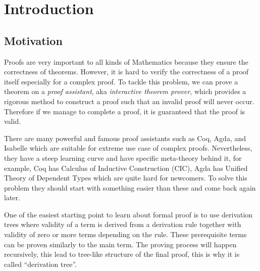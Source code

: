 \documentclass[master.tex]{subfiles}
\begin{document}
\chapter{Introduction}

\section{Motivation}

Proofs are very important to all kinds of Mathematics because they ensure the
correctness of theorems. However, it is hard to verify the correctness of a
proof itself especially for a complex proof. To tackle this problem, we can
prove a theorem on a \emph{proof assistant}, aka \emph{interactive theorem
  prover}, which provides a rigorous method to construct a proof such that an
invalid proof will never occur. Therefore if we manage to complete a proof, it
is guaranteed that the proof is valid.

There are many powerful and famous proof assistants such as
Coq\supercite{coq-official-website}, Agda\supercite{agda-official-website}, and
Isabelle\supercite{isabelle-official-website} which are suitable for extreme use
case of complex proofs. Nevertheless, they have a steep learning curve and have
specific meta-theory behind it, for example, Coq has Calculus of Inductive
Construction (CIC), Agda has Unified Theory of Dependent
Types\supercite{norell:thesis}\supercite{Luo:1994:CRT:184757} which are quite
hard for newcomers. To solve this problem they should start with something
easier than these and come back again later.

One of the easiest starting point to learn about formal proof is to use
derivation trees where validity of a term is derived from a derivation rule
together with validity of zero or more terms depending on the rule. These
prerequisite terms can be proven similarly to the main term. The proving process
will happen recursively, this lead to tree-like structure of the final proof,
this is why it is called ``derivation tree''.
\end{document}
